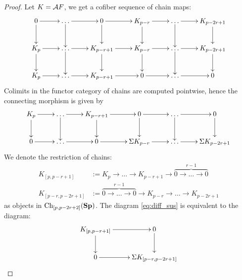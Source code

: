 \begin{proof}
    Let $K = \mathcal{A} F$, we get a cofiber sequence of chain maps:
    \begin{equation*}
        \xymatrix
        {
            0   \ar[r]\ar[d]    & \dots \ar[r]\ar[d]& 0 \ar[r]\ar[d]         &  K_{p-r} \ar[r]\ar[d] & \dots \ar[r]\ar[d]& K_{p-2r+1}\ar[d] \\
            K_p \ar[r]\ar[d]    & \dots \ar[r]\ar[d]& K_{p-r+1}\ar[r]\ar[d] &  K_{p-r} \ar[r]\ar[d] & \dots \ar[r]\ar[d]& K_{p-2r+1}\ar[d] \\
            K_p \ar[r]          & \dots \ar[r]      & K_{p-r+1} \ar[r]      &  0 \ar[r]            & \dots \ar[r]     & 0
        }
    \end{equation*}
    Colimits in the functor category of chains are computed pointwise, hence the connecting morphism is given by
    \begin{equation}\label{eq:diff_sus}
        \xymatrix
        {
            K_p   \ar[r]\ar[d]  & \dots \ar[r]\ar[d]    & K_{p-r+1} \ar[r]\ar[d]    & 0 \ar[r]\ar[d]            & \dots \ar[r]\ar[d] & 0\ar[d] \\
            0 \ar[r]            & \dots \ar[r]          & 0 \ar[r]                  &  \Sigma K_{p-r} \ar[r]    & \dots \ar[r]       &  \Sigma K_{p-2r+1}
        }
    \end{equation}
    We denote the restriction of chains:
    \begin{align*}
        K_{[p,p-r+1]}    & := K_p \to \dots \to K_{p-r+1} \to \overbrace{0 \to \dots \to 0}^{r-1}      \\
        K_{[p-r,p-2r+1]} & := \overbrace{0 \to \dots \to 0}^{r-1} \to K_{p-r} \to \dots \to K_{p-2r+1}
    \end{align*}
    as objects in $\operatorname{Ch}_{[p,p-2r+2]}(\mathbf{Sp})$.
    The diagram \cref{eq:diff_sus} is equivalent to the diagram:
    \begin{equation*}
        \xymatrix
        {
            K_{[p,p-r+1]} \ar[r]\ar[d]  & 0 \ar[d] \\
            0 \ar[r]                    & \Sigma K_{[p-r,p-2r+1]}
        }
    \end{equation*}

\end{proof}
